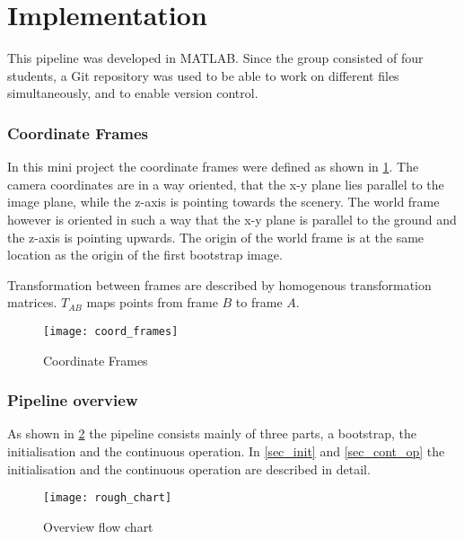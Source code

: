 \section{Implementation}

This pipeline was developed in MATLAB. Since the group consisted of four students, a Git repository was used to be able to work on different files simultaneously, and to enable version control.

\subsubsection{Coordinate Frames}
In this mini project the coordinate frames were defined as shown in \cref{img_coord_frames}. The camera coordinates are in a way oriented, that the x-y plane lies parallel to the image plane, while the z-axis is pointing towards the scenery. The world frame however is oriented in such a way that the x-y plane is parallel to the ground and the z-axis is pointing upwards. The origin of the world frame is at the same location as the origin of the first bootstrap image.

Transformation between frames are described by homogenous transformation matrices. $T_{AB}$ maps points from frame $B$ to frame $A$.

\begin{figure}[ht]
	\centering
	\texttt{[image: coord\_frames]}
	\caption{Coordinate Frames}
	\label{img_coord_frames}
\end{figure}

\subsubsection{Pipeline overview}

As shown in \cref{img_flow_rough} the pipeline consists mainly of three parts, a bootstrap, the initialisation and the continuous operation. In \cref{sec_init} and \cref{sec_cont_op} the initialisation and the continuous operation are described in detail.

\begin{figure}[ht]
	\centering
	\texttt{[image: rough\_chart]}
	\caption{Overview flow chart}
	\label{img_flow_rough}
\end{figure}

%

